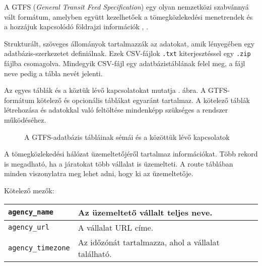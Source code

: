 
A GTFS (\textit{General Transit Feed Specification}) egy olyan nemzetközi szabvánnyá vált formátum, amelyben együtt kezelhetőek a tömegközlekedési menetrendek és a hozzájuk kapcsolódó földrajzi információk \cite{gtfs}, \cite{gtfsspec}.

Strukturált, szöveges állományok tartalmazzák az adatokat, amik lényegében egy adatbázis-szerkezetet definiálnak. Ezek CSV-fájlok \texttt{.txt} kiterjesztéssel egy \texttt{.zip} fájlba csomagolva. Mindegyik CSV-fájl egy adatbázistáblának felel meg, a fájl neve pedig a tábla nevét jelenti.

Az egyes táblák és a köztük lévő kapcsolatokat mutatja . ábra. A GTFS-formátum kötelező és opcionális táblákat egyaránt tartalmaz. A kötelező táblák létrehozása és adatokkal való feltöltése mindenképp szükséges a rendszer működéséhez.


\begin{figure}
\centering

\caption{A GTFS-adatbázis tábláinak sémái és a közöttük lévő kapcsolatok}
\label{fig:gtfs}
\end{figure}



A tömegközlekedési hálózat üzemeltetőjéről tartalmaz információkat. Több rekord is megadható, ha a járatokat több vállalat is üzemelteti. A route táblában minden viszonylatra meg lehet adni, hogy ki az üzemeltetője.

\medskip

\noindent Kötelező mezők:

\bigskip

\begin{tabular}{|p{3.5cm}|p{10cm}|}
\hline
\texttt{agency\_name} & Az üzemeltető vállalt teljes neve. \\
\hline
\texttt{agency\_url} & A vállalat URL címe. \\
\hline
\texttt{agency\_timezone} & Az időzónát tartalmazza, ahol a vállalat található. \\
\hline
\end{tabular}

